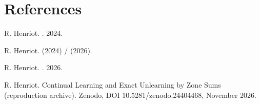 \documentclass[11pt]{article}
\begin{document}
\section*{References}
\begin{enumerate}[label={[\arabic*]},leftmargin=2em,itemsep=1pt]
  \item \hypertarget{reference:1}{}R. Henriot. . 2024.
  \item \hypertarget{reference:2}{}R. Henriot.  (2024) /  (2026).
  \item \hypertarget{reference:3}{}R. Henriot. . 2026.
  \item \hypertarget{reference:4}{}R. Henriot. Continual Learning and Exact Unlearning by Zone Sums (reproduction archive). Zenodo, DOI 10.5281/zenodo.24404468, November 2026.
\end{enumerate}
\end{document}
